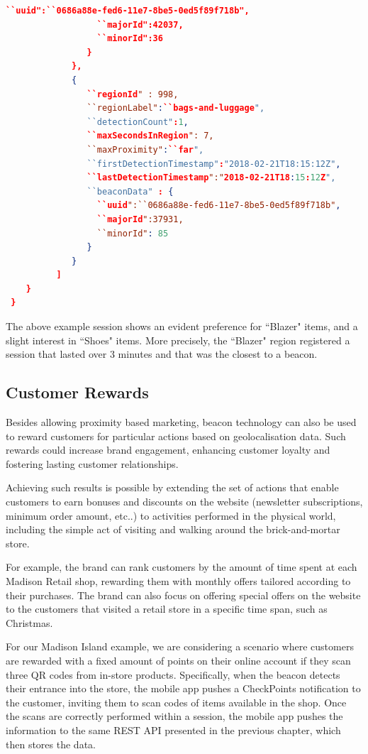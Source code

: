 \begin{lstlisting}[language=json,firstnumber=1]
                  ``uuid":``0686a88e-fed6-11e7-8be5-0ed5f89f718b",
                  ``majorId":42037,
                  ``minorId":36
                }
             },
             {
                ``regionId" : 998,
                ``regionLabel":``bags-and-luggage",
                ``detectionCount":1,
                ``maxSecondsInRegion": 7,
                ``maxProximity":``far",
                ``firstDetectionTimestamp":"2018-02-21T18:15:12Z",
                ``lastDetectionTimestamp":"2018-02-21T18:15:12Z",
                ``beaconData" : {
                  ``uuid":``0686a88e-fed6-11e7-8be5-0ed5f89f718b",
                  ``majorId":37931,
                  ``minorId": 85
                }
             }
          ]
    }
 }
  \end{lstlisting}
\vspace{0.5cm}


The above example session shows an evident preference for ``Blazer" items, and a slight interest in ``Shoes" items. More precisely, the ``Blazer" region registered a session that lasted over 3 minutes and that was the closest to a beacon.  

\subsection{Customer Rewards}

Besides allowing proximity based marketing, beacon technology can also be used to reward customers for particular actions based on geolocalisation data. Such rewards could increase brand engagement, enhancing customer loyalty and fostering lasting customer relationships. 

Achieving such results is possible by extending the set of actions that enable customers to earn bonuses and discounts on the website (newsletter subscriptions, minimum order amount, etc..) to activities performed in the physical world, including the simple act of visiting and walking around the brick-and-mortar store.

For example, the brand can rank customers by the amount of time spent at each Madison Retail shop, rewarding them with monthly offers tailored according to their purchases. The brand can also focus on offering special offers on the website to the customers that visited a retail store in a specific time span, such as Christmas.

For our Madison Island example, we are considering a scenario where customers are rewarded with a fixed amount of points on their online account if they scan three QR codes from in-store products. Specifically, when the beacon detects their entrance into the store, the mobile app pushes a CheckPoints notification to the customer, inviting them to scan codes of items available in the shop. Once the scans are correctly performed within a session, the mobile app pushes the information to the same REST API presented in the previous chapter, which then stores the data.

